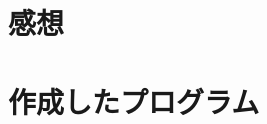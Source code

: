 \documentclass[a4j,11pt]{jarticle}
\begin{document}
\section{感想}

\section{作成したプログラム}\label{sec:sourcecode}
%
%
{\fontsize{10pt}{11pt} \selectfont
\begin{verbatim}
\end{verbatim}
}

\end{document}
